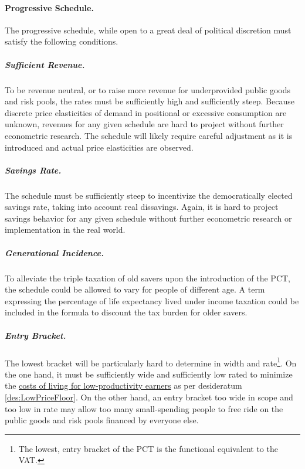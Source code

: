 \paragraph{Progressive Schedule.} The progressive schedule, while open to a great deal of political discretion must satisfy the following conditions. 
\subparagraph{Sufficient Revenue.} To be revenue neutral, or to raise more revenue for underprovided public goods and risk pools, the rates must be sufficiently high and sufficiently steep. Because discrete price elasticities of demand in positional or excessive consumption are unknown, revenues for any given schedule are hard to project without further econometric research. 
The schedule will likely require careful adjustment as it is introduced and actual price elasticities are observed.
\subparagraph{Savings Rate.} The schedule must be sufficiently steep to incentivize the democratically elected savings rate, taking into account real dissavings. Again, it is hard to project savings behavior for any given schedule without further econometric research or implementation in the real world.
\subparagraph{Generational Incidence.} To alleviate the triple taxation of old savers upon the introduction of the PCT, the schedule could be allowed to vary for people of different age. A term expressing the percentage of life expectancy lived under income taxation could be included in the formula to discount the tax burden for older savers.
\subparagraph{Entry Bracket.} The lowest bracket will be particularly hard to determine in width and rate\footnote{
	The lowest, entry bracket of the PCT is the functional equivalent to the VAT.}. 
On the one hand, it must be sufficiently wide and sufficiently low rated to minimize the \hyperref[des:LowPriceFloor]{costs of living for low-productivity earners} as per desideratum \ref{des:LowPriceFloor}. On the other hand, an entry bracket too wide in scope and too low in rate may allow too many small-spending people to free ride on the public goods and risk pools financed by everyone else.

